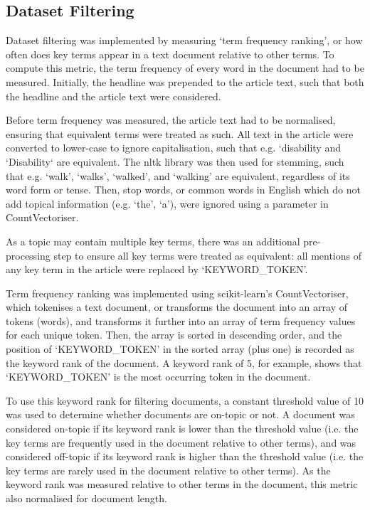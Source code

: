 \documentclass{report}
\begin{document}
\subsection{Dataset Filtering} \label{des-filtering}

Dataset filtering was implemented by measuring `term frequency ranking', or how often does key terms appear in a text document relative to other terms.
To compute this metric, the term frequency of every word in the document had to be measured.
Initially, the headline was prepended to the article text, such that both the headline and the article text were considered.

Before term frequency was measured, the article text had to be normalised, ensuring that equivalent terms were treated as such.
All text in the article were converted to lower-case to ignore capitalisation, such that e.g. `disability and `Disability` are equivalent.
The nltk library \cite{Nltk} was then used for stemming, such that e.g. `walk', `walks', `walked', and `walking' are equivalent, regardless of its word form or tense.
Then, stop words, or common words in English which do not add topical information (e.g. `the', `a'), were ignored using a parameter in CountVectoriser.

As a topic may contain multiple key terms, there was an additional pre-processing step to ensure all key terms were treated as equivalent: all mentions of any key term in the article were replaced by `KEYWORD\_TOKEN'.

Term frequency ranking was implemented using scikit-learn's \cite{Scikit-learn} CountVectoriser, which tokenises a text document, or transforms the document into an array of tokens (words), and transforms it further into an array of term frequency values for each unique token.
Then, the array is sorted in descending order, and the position of `KEYWORD\_TOKEN' in the sorted array (plus one) is recorded as the keyword rank of the document.
A keyword rank of 5, for example, shows that `KEYWORD\_TOKEN' is the  most occurring token in the document.

To use this keyword rank for filtering documents, a constant threshold value of 10 was used to determine whether documents are on-topic or not.
A document was considered on-topic if its keyword rank is lower than the threshold value (i.e. the key terms are frequently used in the document relative to other terms), and was considered off-topic if its keyword rank is higher than the threshold value (i.e. the key terms are rarely used in the document relative to other terms).
As the keyword rank was measured relative to other terms in the document, this metric also normalised for document length.
\end{document}
